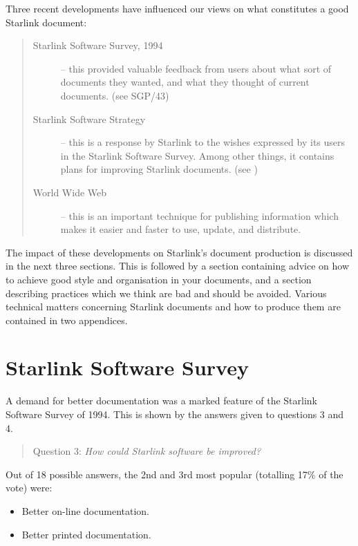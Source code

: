\documentclass[twoside,11pt,nolof]{starlink}
\begin{document}
Three recent developments have influenced our views on what constitutes a good
Starlink document:

\begin{quote}
\begin{description}

\item [Starlink Software Survey, 1994] -- this provided valuable feedback
from users about what sort of documents they wanted, and what they thought
of current documents. (see SGP/43)

\item [Starlink Software Strategy] -- this is a response by Starlink to the
wishes expressed by its users in the Starlink Software Survey.
Among other things, it contains plans for improving Starlink documents.
(see )

\item [World Wide Web] -- this is an important technique for publishing
information which makes it easier and faster to use, update, and distribute.

\end{description}
\end{quote}

The impact of these developments on Starlink's document production is discussed
in the next three sections.
This is followed by a section containing advice on how to achieve good style and
organisation in your documents, and a section describing practices which
we think are bad and should be avoided.
Various technical matters concerning Starlink documents and how to produce
them are contained in two appendices.

\section{Starlink Software Survey}

A demand for better documentation was a marked feature of the Starlink
Software Survey of 1994.
This is shown by the answers given to questions 3 and 4.

\begin{quote}
Question 3: \emph{How could Starlink software be improved?}
\end{quote}

Out of 18 possible answers, the 2nd and 3rd most popular (totalling 17\%
of the vote) were:
\begin{itemize}
\item Better on-line documentation.
\item Better printed documentation.
\end{itemize}
\end{document}
